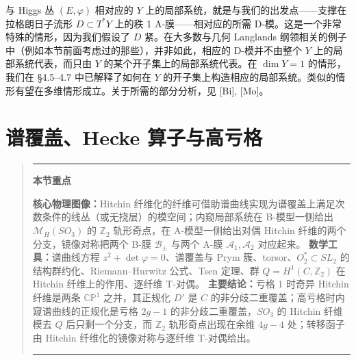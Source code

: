\documentclass[11pt,a4paper]{article}
\newenvironment{keytakeaway}
  {\par\medskip\begin{quote}\small\noindent
   \rule{\linewidth}{0.6pt}\par\nopagebreak\smallskip\noindent
   \textbf{本节重点}\par\nobreak\smallskip\noindent\ignorespaces}
  {\par\smallskip\noindent\rule{\linewidth}{0.6pt}\end{quote}\medskip}
\begin{document}

与 Higgs 丛 $(E,\varphi)$ 相对应的 $Y$ 上的局部系统，就是与我们的出发点——支撑在拉格朗日子流形 $D\subset T^*Y$ 上的秩 1 A-膜——相对应的所需 D-模。这是一个非常特殊的情形，因为我们假设了 $D$ 紧。在大多数与几何 Langlands 纲领相关的例子中（例如本节前面考虑过的那些），并非如此，相应的 D-模并不由整个 $Y$ 上的局部系统代表，而只由 $Y$ 的某个开子集上的局部系统代表。在 $\dim Y=1$ 的情形，我们在 §4.5--4.7 中已解释了如何在 $Y$ 的开子集上构造相应的局部系统。类似的情形有望在多维情形成立。关于所需的部分分析，见 [Bi], [Mo]。




\section{谱覆盖、Hecke 算子与高亏格}

\begin{keytakeaway}
\textbf{核心物理图像：}Hitchin 纤维化的纤维可借助谱曲线实现为谱覆盖上满足次数条件的线丛（或无挠层）的模空间；内窥局部系统在 B-模型一侧给出 $\mathcal{M}_H(SO_3)$ 的 $\mathbb{Z}_2$ 轨形奇点，在 A-模型一侧给出对偶 Hitchin 纤维的两个分支，镜像对称把两个 B-膜 $\mathcal{B}_\pm$ 与两个 A-膜 $\mathcal{A}_1,\mathcal{A}_2$ 对应起来。
\textbf{数学工具：}谱曲线方程 $z^2+\det\varphi=0$、谱覆盖与 Prym 簇、torsor、$O_2^*\subset SL_2$ 的结构群约化、Riemann--Hurwitz 公式、Tsen 定理、群 $Q=H^1(C,\mathbb{Z}_2)$ 在 Hitchin 纤维上的作用、逐纤维 T-对偶。
\textbf{主要结论：}亏格 1 时奇异 Hitchin 纤维是两条 $\mathbb{CP}^1$ 之并，其正规化 $D'$ 是 $C$ 的非分歧二重覆盖；高亏格时内窥谱曲线的正规化是亏格 $2g-1$ 的非分歧二重覆盖，$SO_3$ 的 Hitchin 纤维模去 $Q$ 后只剩一个分支，而 $\mathbb{Z}_2$ 轨形奇点出现在余维 $4g-4$ 处；转移函子由 Hitchin 纤维化的镜像对称与逐纤维 T-对偶给出。
\end{keytakeaway}
\end{document}
